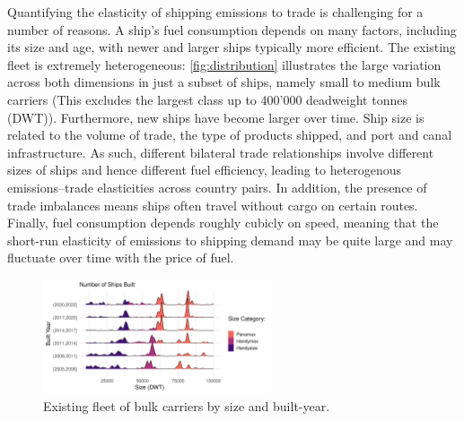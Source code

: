 \documentclass[hidelinks, 12pt,letterpaper]{article}
\begin{document}
Quantifying the elasticity of shipping emissions to trade is challenging for a number of reasons. A ship's fuel consumption depends on many factors, including its size and age, with newer and larger ships typically more efficient. The existing fleet is extremely heterogeneous: \autoref{fig:distribution} illustrates the large variation across both dimensions in just a subset of ships, namely small to medium bulk carriers (This excludes the largest class up to 400'000 deadweight tonnes (DWT)). Furthermore, new ships have become larger over time. Ship size is related to the volume of trade, the type of products shipped, and port and canal infrastructure. As such, different bilateral trade relationships involve different sizes of ships and hence different fuel efficiency, leading to heterogenous emissions--trade elasticities across country pairs. In addition, the presence of trade imbalances means ships often travel without cargo on certain routes. Finally, fuel consumption depends roughly cubicly on speed, meaning that the short-run elasticity of emissions to shipping demand may be quite large and may fluctuate over time with the price of fuel. 

\begin{figure}[h]
  \centering
  \includegraphics[width = 0.6\textwidth]{WFR_Bulkers_Exploration_Size_Built_horizontalridges.png}
  \caption{Existing fleet of bulk carriers by size and built-year.}
  \label{fig:distribution}
\end{figure} 
\end{document}
